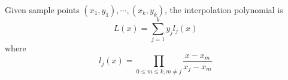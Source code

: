Given sample points $(x_1, y_1), \cdots, (x_k, y_k)$, the interpolation polynomial is
$$ L(x) = \sum_{j = 1}^k y_jl_j(x) $$
where
$$ l_j(x) = \prod_{0 \leq m \leq k, m \neq j} \frac{x - x_m}{x_j - x_m} $$

